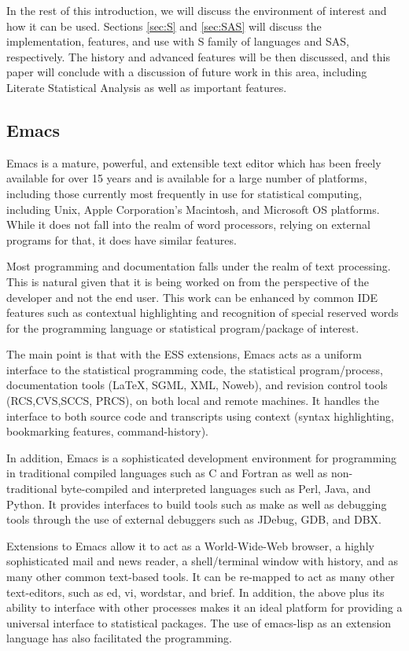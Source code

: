 \documentclass{article}
\begin{document}
In the rest of this introduction, we will discuss the environment of
interest and how it can be used.  Sections \ref{sec:S} and
\ref{sec:SAS} will discuss the implementation, features, and use with
S family of languages and SAS, respectively.  The history and advanced
features will be then discussed, and this paper will conclude with a
discussion of future work in this area, including Literate Statistical
Analysis as well as important features.

\subsection{Emacs}
\label{sec:intro:emacs}

Emacs is a mature, powerful, and extensible text editor which has been
freely available for over 15 years and is available for a large number
of platforms, including those currently most frequently in use for
statistical computing, including Unix, Apple Corporation's Macintosh,
and Microsoft OS platforms.  While it does not fall into the realm of
word processors, relying on external programs for that, it does have
similar features.

Most programming and documentation falls under the realm of text
processing.  This is natural given that it is being worked on from the
perspective of the developer and not the end user.  This work can be
enhanced by common IDE features such as contextual highlighting and
recognition of special reserved words for the programming language or
statistical program/package of interest.

The main point is that with the ESS extensions, Emacs acts as a
uniform interface to the statistical programming code, the statistical
program/process, documentation tools (\LaTeX, SGML, XML, Noweb), and
revision control tools (RCS,CVS,SCCS, PRCS), on both local and remote
machines.  It handles the interface to both source code and
transcripts using context (syntax highlighting, bookmarking features,
command-history).

In addition, Emacs is a sophisticated development environment for
programming in traditional compiled languages such as C and Fortran as
well as non-traditional byte-compiled and interpreted languages such
as Perl, Java, and Python.  It provides interfaces to build tools such
as make as well as debugging tools through the use of external
debuggers such as JDebug, GDB, and DBX. 

Extensions to Emacs allow it to act as a World-Wide-Web browser, a
highly sophisticated mail and news reader, a shell/terminal window
with history, and as many other common text-based tools.  It can be
re-mapped to act as many other text-editors, such as ed, vi, wordstar,
and brief.  In addition, the above plus its ability to interface with
other processes makes it an ideal platform for providing a universal
interface to statistical packages.  The use of emacs-lisp as an
extension language has also facilitated the programming.
\end{document}
